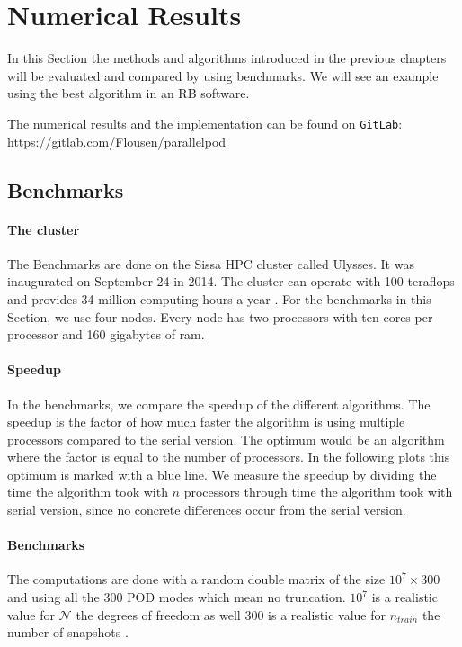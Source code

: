 \chapter{Numerical Results}
In this Section the methods and algorithms introduced in the previous chapters will be evaluated and compared by using benchmarks.
We will see an example using the best algorithm in an RB software.

The numerical results and the implementation can be found on \texttt{GitLab}:\\ 
\url{https://gitlab.com/Flousen/parallelpod}

\section{Benchmarks}
\label{sec:Benchmarks}
\subsubsection{The cluster}
The Benchmarks are done on the Sissa HPC cluster called Ulysses.
It was inaugurated on September 24 in 2014. The cluster can operate with 100 teraflops and provides 34 million computing hours a year \cite{sissaHPC}.
For the benchmarks in this Section, we use four nodes. 
Every node has two processors with ten cores per processor and 160 gigabytes of ram.

\subsubsection{Speedup}
In the benchmarks, we compare the speedup of the different algorithms.
The speedup is the factor of how much faster the algorithm is using multiple processors compared to the serial version.
The optimum would be an algorithm where the factor is equal to the number of processors. 
In the following plots this optimum is marked with a blue line.
We measure the speedup by dividing the time the algorithm took with $n$ processors through time the algorithm took with serial version, since no concrete differences occur from the serial version.

\subsubsection{Benchmarks}
The computations are done with a random double matrix of the size $10^7 \times 300$ and using all the $300$ POD modes which mean no truncation.
$10^7$ is a realistic value for $ \mathcal{ N }$ the degrees of freedom as well $300$ is a realistic value for $n_{train}$ the number of snapshots \cite{strazzullo2017model}.


